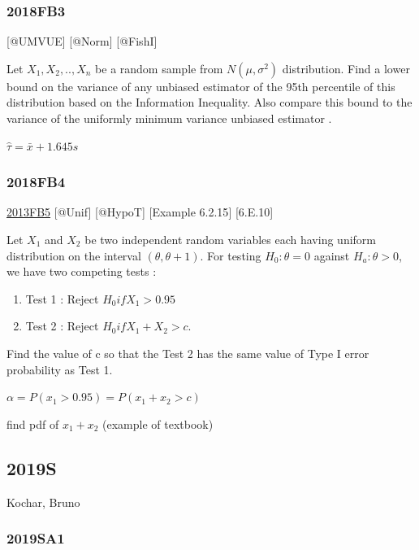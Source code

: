 \documentclass[6pt,Portrait]{article}
\begin{document}
\hypertarget{fb3-4}{%
\subsubsection{2018FB3}\label{fb3-4}}

{[}@UMVUE{]} {[}@Norm{]} {[}@FishI{]}

Let \(X_1,X_2,..,X_n\) be a random sample from \(N(\mu,\sigma^2)\)
distribution. Find a lower bound on the variance of any unbiased
estimator of the 95th percentile of this distribution based on the
Information Inequality. Also compare this bound to the variance of the
uniformly minimum variance unbiased estimator .

\(\hat\tau=\bar x+1.645s\)

\hypertarget{fb4-4}{%
\subsubsection{2018FB4}\label{fb4-4}}

\protect\hyperlink{fb5}{2013FB5} {[}@Unif{]} {[}@HypoT{]} {[}Example
6.2.15{]} {[}6.E.10{]}

Let \(X_1\) and \(X_2\) be two independent random variables each having
uniform distribution on the interval \((\theta,\theta+1)\). For testing
\(H_0:\theta=0\) against \(H_a:\theta> 0\), we have two competing tests
:

\begin{enumerate}
\def\labelenumi{\arabic{enumi}.}
\item
  Test 1 : Reject \(H_0 if X_1>0.95\)
\item
  Test 2 : Reject \(H_0 if X_1+X_2>c\).
\end{enumerate}

Find the value of c so that the Test 2 has the same value of Type I
error probability as Test 1.

\(\alpha=P(x_1>0.95)=P(x_1+x_2>c)\)

find pdf of \(x_1+x_2\) (example of textbook)

\hypertarget{s-12}{%
\subsection{2019S}\label{s-12}}

Kochar, Bruno

\hypertarget{sa1-3}{%
\subsubsection{2019SA1}\label{sa1-3}}
\end{document}
